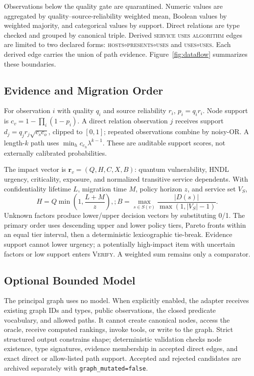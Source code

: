 \documentclass[a4paper,twoside]{article}
\newcommand{\rel}[1]{\textsc{#1}}          %
\newcommand{\verify}{\textsc{Verify}\xspace}
\begin{document}
Observations below the quality gate are quarantined. Numeric values are aggregated by quality--source-reliability weighted mean, Boolean values by weighted majority, and categorical values by support. Direct relations are type checked and grouped by canonical triple. Derived \rel{service uses algorithm} edges are limited to two declared forms: \rel{hosts}$\circ$\rel{presents}$\circ$\rel{uses} and \rel{uses}$\circ$\rel{uses}. Each derived edge carries the union of path evidence. Figure~\ref{fig:dataflow} summarizes these boundaries.

\subsection{Evidence and Migration Order}

For observation $i$ with quality $q_i$ and source reliability $r_i$, $p_i = q_i r_i$. Node support is $c_v = 1 - \prod_i (1 - p_i)$. A direct relation observation $j$ receives support $d_j = q_j r_j \sqrt{c_s c_o}$, clipped to $[0,1]$; repeated observations combine by noisy-OR. A length-$k$ path uses $\min_h c_{e_h} \lambda^{k-1}$. These are auditable support scores, not externally calibrated probabilities.

The impact vector is $\mathbf{r}_v = (Q, H, C, X, B)$: quantum vulnerability, HNDL urgency, criticality, exposure, and normalized transitive service dependents. With confidentiality lifetime $L$, migration time $M$, policy horizon $z$, and service set $V_S$,
\begin{equation}
H = Q \min\!\left(1, \frac{L+M}{z}\right),;
B = \max_{s \in S(v)} \frac{|D(s)|}{\max(1, |V_S| - 1)} .
\label{eq:impact}
\end{equation}
Unknown factors produce lower/upper decision vectors by substituting 0/1. The primary order uses descending upper and lower policy tiers, Pareto fronts within an equal tier interval, then a deterministic lexicographic tie-break. Evidence support cannot lower urgency; a potentially high-impact item with uncertain factors or low support enters \verify. A weighted sum remains only a comparator.

\subsection{Optional Bounded Model}

The principal graph uses no model. When explicitly enabled, the adapter receives existing graph IDs and types, public observations, the closed predicate vocabulary, and allowed paths. It cannot create canonical nodes, access the oracle, receive computed rankings, invoke tools, or write to the graph. Strict structured output constrains shape; deterministic validation checks node existence, type signatures, evidence membership in accepted direct edges, and exact direct or allow-listed path support. Accepted and rejected candidates are archived separately with \texttt{graph\_mutated=false}.
\end{document}

